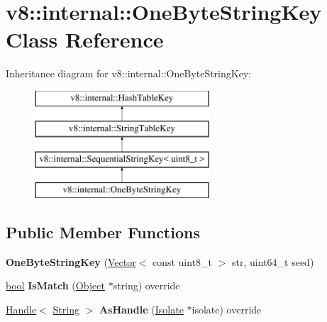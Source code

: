 \hypertarget{classv8_1_1internal_1_1OneByteStringKey}{}\section{v8\+:\+:internal\+:\+:One\+Byte\+String\+Key Class Reference}
\label{classv8_1_1internal_1_1OneByteStringKey}
Inheritance diagram for v8\+:\+:internal\+:\+:One\+Byte\+String\+Key\+:\begin{figure}[H]
\begin{center}
\leavevmode
\includegraphics[height=4.000000cm]{classv8_1_1internal_1_1OneByteStringKey}
\end{center}
\end{figure}
\subsection*{Public Member Functions}
\begin{DoxyCompactItemize}
\item 
\mbox{\label{classv8_1_1internal_1_1OneByteStringKey_a60a820d5b66fb4092c686d3113330651}} 
{\bfseries One\+Byte\+String\+Key} (\mbox{\hyperlink{classv8_1_1internal_1_1Vector}{Vector}}$<$ const uint8\+\_\+t $>$ str, uint64\+\_\+t seed)
\item 
\mbox{\label{classv8_1_1internal_1_1OneByteStringKey_a04cb42e14aafe8d0545b23a8a4689688}} 
\mbox{\hyperlink{classbool}{bool}} {\bfseries Is\+Match} (\mbox{\hyperlink{classv8_1_1internal_1_1Object}{Object}} $\ast$string) override
\item 
\mbox{\label{classv8_1_1internal_1_1OneByteStringKey_add405b4ef1d838d24cfa170a1f2fee7b}} 
\mbox{\hyperlink{classv8_1_1internal_1_1Handle}{Handle}}$<$ \mbox{\hyperlink{classv8_1_1internal_1_1String}{String}} $>$ {\bfseries As\+Handle} (\mbox{\hyperlink{classv8_1_1internal_1_1Isolate}{Isolate}} $\ast$isolate) override
\end{DoxyCompactItemize}
